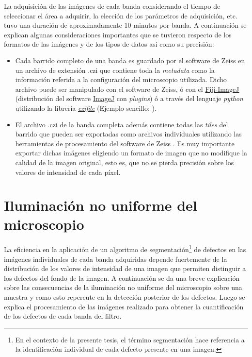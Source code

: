 La adquisición de las imágenes de cada banda considerando el tiempo de seleccionar el área a adquirir, la elección de los parámetros de adquisición, etc. tuvo una duración de aproximadamente 10 minutos por banda. A continuación se explican algunas consideraciones importantes que se tuvieron respecto de los formatos de las imágenes y de los tipos de datos así como su precisión:
\begin{itemize}
\justifying
\item Cada barrido completo de una banda es guardado por el software de Zeiss en un archivo de extensión .czi que contiene toda la \textit{metadata} como la información referida a la configuración del microscopio utilizada. Dicho archivo puede ser manipulado con el software de Zeiss, ó con el \href{https://imagej.net/Fiji}{Fiji-ImageJ} (distribución del software \href{https://imagej.nih.gov/ij/}{ImageJ} con \textit{plugins}) ó a través del lenguaje \textit{python} utilizando la librería \href{https://pypi.org/project/czifile/}{\textit{czifile}} (Ejemplo sencillo: \href{https://github.com/jrr1984/defects_analysis/blob/master/zeiss_cfi.ipynb}{\faGithub}).
\item El archivo .czi de la banda completa además contiene todas las \textit{tiles} del barrido que pueden ser exportadas como archivos individuales utilizando las herramientas de procesamiento del software de Zeiss \cite{tilezeiss}. Es muy importante exportar dichas imágenes eligiendo un formato de imagen que no modifique la calidad de la imagen original, esto es, que no se pierda precisión sobre los valores de intensidad de cada píxel. 
\end{itemize}

\singlespacing
\section{Iluminación no uniforme del microscopio}
\label{sec:ilumnou}

\hspace{0.5cm}La eficiencia en la aplicación de un algoritmo de segmentación\footnote{En el contexto de la presente tesis, el término segmentación hace referencia a la identificación individual de cada defecto presente en una imagen.} de defectos en las imágenes individuales de cada banda adquiridas depende fuertemente de la distribución de los valores de intensidad de una imagen que permiten distinguir a los defectos del fondo de la imagen. A continuación se da una breve explicación sobre las consecuencias de la iluminación no uniforme del microscopio sobre una muestra y como esto repercute en la detección posterior de los defectos. Luego se explica el procesamiento de las imágenes realizado para obtener la cuantificación de los defectos de cada banda del filtro.

